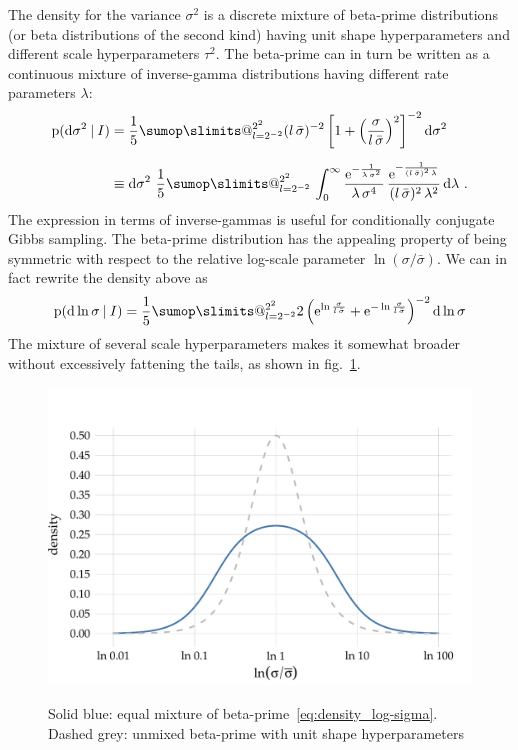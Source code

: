 \documentclass[\ifafour a4paper,12pt,\else a5paper,10pt,\fi%
onecolumn,oneside,article,%
british%
]{memoir}
\makeatletter
\theoremstyle{remark}
\theoremstyle{innote}
\def\sum{\DOTSI\sumop\slimits@}
\newcommand*{\e}{\ensuremath{\mathrm{e}}}
\newcommand*{\di}{\mathrm{d}}%
\newcommand*{\p}{\mathrm{p}}%
\renewcommand*{\|}[1][]{\nonscript\:#1\vert\nonscript\:\mathopen{}}
\newcommand*{\sect}{\S}%
\newcommand*{\fig}{fig.}%
\newcommand*{\sigmao}{\bar{\sigma}}
\makeatother
\begin{document}
\medskip

The density for the variance $\sigma^{2}$ is a discrete mixture of beta-prime distributions (or beta distributions of the second kind) \autocites[\sect\,25.7, 27.2]{johnsonetal1970b_r1995}{mcdonald1984} having unit shape hyperparameters and different scale hyperparameters $\tau^{2}$. The beta-prime can in turn be written as a continuous mixture of inverse-gamma distributions \autocites{dubey1970} having different rate parameters $\lambda$:
\begin{equation}
  \label{eq:density_sigma}
  \begin{split}
    \p(\di\sigma^{2}\|I) &=
    \frac{1}{5}\sum_{l=2^{-2}}^{2^{2}}
    (l\,\sigmao)^{-2}\,\biggl[1+\Bigl(\frac{\sigma}{l\,\sigmao}\Bigr)^{2}\biggr]^{-2}
    \,\di\sigma^{2}
  \\[2\jot]
  &\equiv
    \di\sigma^{2}\ 
    \frac{1}{5}\sum_{l=2^{-2}}^{2^{2}}\,
    \int_{0}^{\infty}
    \frac{\e^{-\frac{1}{\lambda\,\sigma^{2}}}}{
    \lambda\,\sigma^{4}
  }\,
    \frac{\e^{-\frac{1}{(l\,\sigmao)^{2}\,\lambda}}}{
    (l\,\sigmao)^{2}\,\lambda^{2}
  }\,\di\lambda \ .
\end{split}
\end{equation}
The expression in terms of inverse-gammas is useful for conditionally conjugate Gibbs sampling. The beta-prime distribution has the appealing property of being symmetric with respect to the relative log-scale parameter $\ln(\sigma/\sigmao)$. We can in fact rewrite the density above as
\begin{equation}
  \label{eq:density_log-sigma}
    \p(\di \ln\sigma\|I) =
    \frac{1}{5}\sum_{l=2^{-2}}^{2^{2}}
    2\,\Bigl(
    \e^{\ln\frac{\sigma}{l\,\sigmao}}
+    \e^{-\ln\frac{\sigma}{l\,\sigmao}}
    \Bigr)^{-2}\, \di\ln\sigma
\end{equation}
The mixture of several scale hyperparameters makes it somewhat broader without excessively fattening the tails, as shown in \fig~\ref{fig:betaprime}.
\begin{figure}
\centering\includegraphics[width=0.75\linewidth]{betaprime.pdf}\\
\caption{Solid blue: equal mixture of beta-prime~\eqref{eq:density_log-sigma}. Dashed grey: unmixed beta-prime with unit shape hyperparameters}\label{fig:betaprime}
\end{figure}
\end{document}
